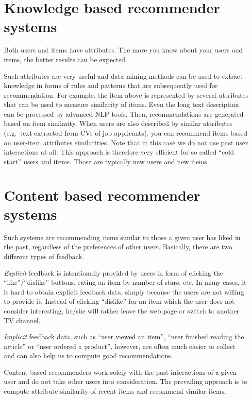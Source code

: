 \documentclass{book}
\begin{document}
\section{Knowledge based recommender systems}
Both users and items have attributes. The more you know about your users and items, the better results can be expected. 

Such attributes are very useful and data mining methods can be used to extract knowledge in forms of rules and patterns that are subsequently used for recommendation. For example, the item above is represented by several attributes that can be used to measure similarity of items. Even the long text description can be processed by advanced NLP tools. Then, recommendations are generated based on item similarity. When users are also described by similar attributes (e.g.\ text extracted from CVs of job applicants), you can recommend items based on user-item attributes similarities. Note that in this case we do not use past user interactions at all. This approach is therefore very efficient for so called ``cold start'' users and items. Those are typically new users and new items.

\section{Content based recommender systems}
Such systems are recommending items similar to those a given user has liked in the past, regardless of the preferences of other users. Basically, there are two different types of feedback.

\emph{Explicit} feedback is intentionally provided by users in form of clicking the ``like''/``dislike'' buttons, rating an item by number of stars, etc. In many cases, it is hard to obtain explicit feedback data, simply because the users are not willing to provide it. Instead of clicking ``dislike'' for an item which the user does not consider interesting, he/she will rather leave the web page or switch to another TV channel.

\emph{Implicit} feedback data, such as ``user viewed an item'', ``user finished reading the article'' or ``user ordered a product'', however, are often much easier to collect and can also help us to compute good recommendations.

Content based recommenders work solely with the past interactions of a given user and do not take other users into consideration. The prevailing approach is to compute attribute similarity of recent items and recommend similar items.
\end{document}
